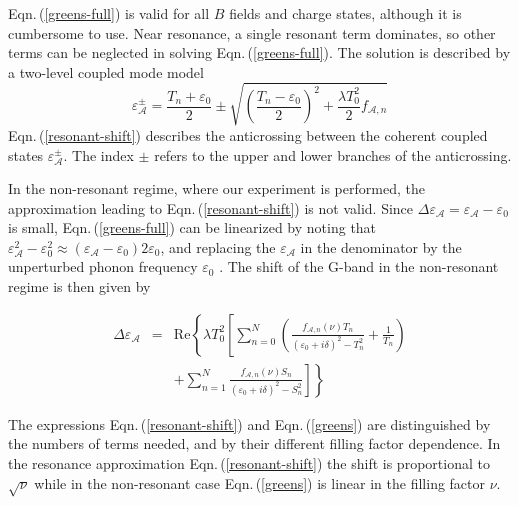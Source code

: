 \documentclass[prl,aps,superscriptaddress,showpacs,reprint]{revtex4-1}
\begin{document}
Eqn.\,(\ref{greens-full}) is valid for all $B$ fields and charge states, although it is cumbersome to use. Near resonance, a single resonant term dominates, so other terms can be neglected in solving Eqn.\,(\ref{greens-full}). The solution is described by a two-level coupled mode model \cite{yan2010observation,PhysRevLett.110.227402}
\begin{equation}
\label{resonant-shift}
\varepsilon_{\mathcal{A}}^{\pm}=\frac{T_n+\varepsilon_0}{2}\pm\sqrt{\left(\frac{T_n-\varepsilon_0}{2}\right)^2+\frac{\lambda T_0^2}{2}f_{\mathcal{A},n}}
\end{equation}
Eqn.\,(\ref{resonant-shift}) describes the anticrossing between the coherent coupled states $\varepsilon_{\mathcal{A}}^{\pm}$. The index $\pm$ refers to the upper and lower branches of the anticrossing.

In the non-resonant regime, where our experiment is performed, the approximation leading to Eqn.\,(\ref{resonant-shift}) is not valid. Since  $\Delta\varepsilon_{\mathcal{A}} = \varepsilon_{\mathcal{A}} - \varepsilon_0$ is small, Eqn.\,(\ref{greens-full}) can be linearized by noting that $\varepsilon_{\mathcal{A}}^2-\varepsilon_0^2 \approx (\varepsilon_{\mathcal{A}}-\varepsilon_0)2\varepsilon_0$, and  replacing the $\varepsilon_{\mathcal{A}}$ in the denominator by the unperturbed phonon frequency $\varepsilon_0$ \cite{ando2007magnetic}. The shift of the G-band in the non-resonant regime is then given by

\begin{eqnarray}
\label{greens}
\Delta\varepsilon_{\mathcal{A}} &=& \mathrm{Re}\left\lbrace \lambda T_0^2 \left[ \sum_{n=0}^N\left(\frac{f_{\mathcal{A},n}\left(\nu\right) T_n}{\left(\varepsilon_{0}+i\delta\right)^2-T_n^2}+\frac{1}{T_n}\right)\right.\right.\nonumber \\
& &\left.\left. +\sum_{n=1}^{N}\frac{f_{\mathcal{A},n}\left(\nu\right) S_n}{\left(\varepsilon_{0}+i\delta\right)^2-S_n^2}\right]\right\rbrace
\end{eqnarray}

The expressions Eqn.\,(\ref{resonant-shift}) and Eqn.\,(\ref{greens}) are distinguished by  the numbers of terms needed, and by their different  filling factor dependence. In the resonance approximation Eqn.\,(\ref{resonant-shift}) the shift is proportional to $ \sqrt{\nu}$ while in the non-resonant case Eqn.\,(\ref{greens}) is linear in the filling factor $\nu$.
\end{document}
